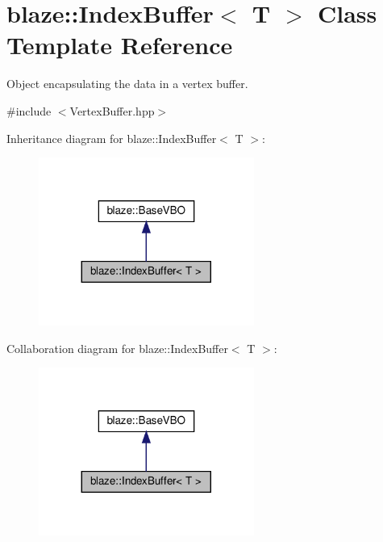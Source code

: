 \hypertarget{classblaze_1_1IndexBuffer}{}\section{blaze\+:\+:Index\+Buffer$<$ T $>$ Class Template Reference}
\label{classblaze_1_1IndexBuffer}


Object encapsulating the data in a vertex buffer.  




{\ttfamily \#include $<$Vertex\+Buffer.\+hpp$>$}



Inheritance diagram for blaze\+:\+:Index\+Buffer$<$ T $>$\+:\nopagebreak
\begin{figure}[H]
\begin{center}
\leavevmode
\includegraphics[width=200pt]{classblaze_1_1IndexBuffer__inherit__graph}
\end{center}
\end{figure}


Collaboration diagram for blaze\+:\+:Index\+Buffer$<$ T $>$\+:\nopagebreak
\begin{figure}[H]
\begin{center}
\leavevmode
\includegraphics[width=200pt]{classblaze_1_1IndexBuffer__coll__graph}
\end{center}
\end{figure}

